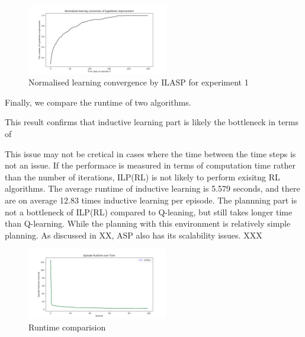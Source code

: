 \begin{figure}[!htb]
\centering
\includegraphics[width=0.55\textwidth]{./figures/experiment1_ilasp}
\caption{Normalised learning convergence by ILASP for experiment 1}
\label{experiment1_ilasp}
\end{figure}

Finally, we compare the runtime of two algorithms. 

This result confirms that inductive learning part is likely the bottleneck in terms of 

This issue may not be cretical in cases where the time between the time steps is not an issue. If the performace is measured in terms of computation time rather than the number of iterations, 
ILP(RL) is not likely to perform exisitng RL algorithms. 
The average runtime of inductive learning is 5.579 seconds, and there are on average 12.83 times inductive learning per episode. 
The plannning part is not a bottleneck of ILP(RL) compared to Q-leaning, but still takes longer time than Q-learning. While the planning with this environment is relatively simple planning. 
As discussed in XX, ASP also has its scalability issues. XXX

\begin{figure}[!htb]
\centering
\includegraphics[width=0.55\textwidth]{./figures/experiment1_runtime}
\caption{Runtime comparision}
\label{experiment1}
\end{figure}


